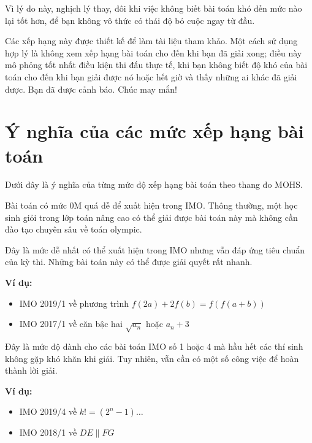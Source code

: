 \documentclass[../imo-training-open-book.tex]{subfiles}
\begin{document}
Vì lý do này, nghịch lý thay, đôi khi việc không biết bài toán khó đến mức nào lại tốt hơn,
để bạn không vô thức có thái độ bỏ cuộc ngay từ đầu.

Các xếp hạng này được thiết kế để làm tài liệu tham khảo. Một cách sử dụng hợp lý là không xem xếp hạng bài toán cho đến khi bạn đã giải xong;
điều này mô phỏng tốt nhất điều kiện thi đấu thực tế,
khi bạn không biết độ khó của bài toán cho đến khi bạn giải được nó hoặc hết giờ và thấy những ai khác đã giải được.
Bạn đã được cảnh báo. Chúc may mắn!

\section*{Ý nghĩa của các mức xếp hạng bài toán}

Dưới đây là ý nghĩa của từng mức độ xếp hạng bài toán theo thang đo MOHS.

\begin{definition*}[0M] \label{definition:0M}
    Bài toán có mức 0M quá dễ để xuất hiện trong IMO.
    Thông thường, một học sinh giỏi trong lớp toán nâng cao có thể giải được bài toán này mà không cần đào tạo chuyên sâu về toán olympic.
\end{definition*}

\begin{definition*}[5M] \label{definition:5M}
    Đây là mức dễ nhất có thể xuất hiện trong IMO nhưng vẫn đáp ứng tiêu chuẩn của kỳ thi. Những bài toán này có thể được giải quyết rất nhanh.

    \textbf{Ví dụ:}
    \begin{itemize}[topsep=0pt, partopsep=0pt, itemsep=0pt]
        \item IMO 2019/1 về phương trình $f(2a) + 2f(b) = f(f(a + b))$
        \item IMO 2017/1 về căn bậc hai $\sqrt{a_n}$ hoặc $a_n + 3$
    \end{itemize}
\end{definition*}

\begin{definition*}[10M] \label{definition:10M}
    Đây là mức độ dành cho các bài toán IMO số 1 hoặc 4 mà hầu hết các thí sinh không gặp khó khăn khi giải. Tuy nhiên, vẫn cần có một số công việc để hoàn thành lời giải.

    \textbf{Ví dụ:}
    \begin{itemize}[topsep=0pt, partopsep=0pt, itemsep=0pt]
        \item IMO 2019/4 về $k! = (2^n-1)\ldots$
        \item IMO 2018/1 về $DE \parallel FG$
    \end{itemize}
\end{definition*}
\end{document}
